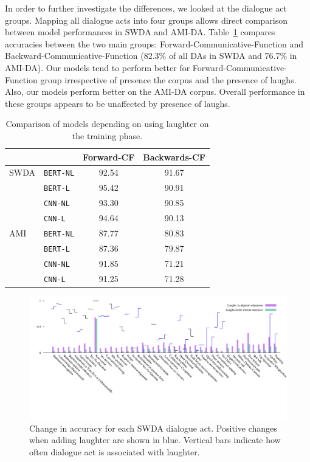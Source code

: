 \documentclass[11pt,a4paper]{article}
\begin{document}


In order to further investigate the differences, we looked at the dialogue act groups.
Mapping all dialogue acts into four groups allows direct comparison between model performances in SWDA and AMI-DA.
Table~\ref{table:laughter-group-acc} compares accuracies between the two main groups: Forward-Communicative-Function and Backward-Communicative-Function (82.3\% of all DAs in SWDA and 76.7\% in AMI-DA).
Our models tend to perform better for Forward-Communicative-Function group irrespective of presence the corpus and the presence of laughs.
Also, our models perform better on the AMI-DA corpus.
Overall performance in these groups appears to be unaffected by presence of laughs.

\begin{table}
  \centering
  \begin{tabular}{@{}llcc@{}}
    \toprule
    &                  & Forward-CF  & Backwards-CF   \\ \midrule
    SWDA &\texttt{BERT-NL}  & 92.54 & 91.67       \\ 
         &\texttt{BERT-L}   & 95.42 & 90.91       \\ 
         &\texttt{CNN-NL}   & 93.30 & 90.85        \\
         &\texttt{CNN-L}    & 94.64 & 90.13        \\ \midrule
    AMI  &\texttt{BERT-NL}  & 87.77 & 80.83       \\ 
         &\texttt{BERT-L}   & 87.36 & 79.87       \\
         &\texttt{CNN-NL}   & 91.85 & 71.21        \\
         &\texttt{CNN-L}    & 91.25 & 71.28        \\    \bottomrule
  \end{tabular}
  \caption{Comparison of models depending on using laughter on the training phase. }
  \label{table:laughter-group-acc}
\end{table}

\begin{figure}
  \centering
  \includegraphics[width=\textwidth]{img/SWDA-bertLvsNL.pdf}
  \caption{Change in accuracy for each SWDA dialogue act. Positive changes when adding laughter are shown in blue. Vertical bars indicate how often dialogue act is associated with laughter.}
    \label{fig:swda-by-da}
\end{figure}
\end{document}
